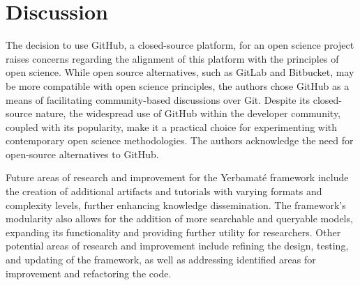 \section{Discussion}

The decision to use GitHub, a closed-source platform, for an open science project raises concerns regarding the alignment of this platform with the principles of open science. While open source alternatives, such as GitLab and Bitbucket, may be more compatible with open science principles, the authors chose GitHub as a means of facilitating community-based discussions over Git. Despite its closed-source nature, the widespread use of GitHub within the developer community, coupled with its popularity, make it a practical choice for experimenting with contemporary open science methodologies. The authors acknowledge the need for open-source alternatives to GitHub. 

Future areas of research and improvement for the Yerbamaté framework include the creation of additional artifacts and tutorials with varying formats and complexity levels, further enhancing knowledge dissemination. The framework's modularity also allows for the addition of more searchable and queryable models, expanding its functionality and providing further utility for researchers. Other potential areas of research and improvement include refining the design, testing, and updating of the framework, as well as addressing identified areas for improvement and refactoring the code.
